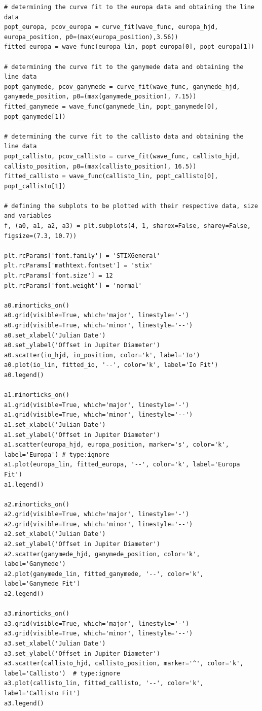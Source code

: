 \documentclass[12pt, a4paper]{article}
\begin{document}
\begin{verbatim}
# determining the curve fit to the europa data and obtaining the line data
popt_europa, pcov_europa = curve_fit(wave_func, europa_hjd, europa_position, p0=(max(europa_position),3.56))
fitted_europa = wave_func(europa_lin, popt_europa[0], popt_europa[1])

# determining the curve fit to the ganymede data and obtaining the line data
popt_ganymede, pcov_ganymede = curve_fit(wave_func, ganymede_hjd, ganymede_position, p0=(max(ganymede_position), 7.15))
fitted_ganymede = wave_func(ganymede_lin, popt_ganymede[0], popt_ganymede[1])

# determining the curve fit to the callisto data and obtaining the line data
popt_callisto, pcov_callisto = curve_fit(wave_func, callisto_hjd, callisto_position, p0=(max(callisto_position), 16.5))
fitted_callisto = wave_func(callisto_lin, popt_callisto[0], popt_callisto[1])

# defining the subplots to be plotted with their respective data, size and variables
f, (a0, a1, a2, a3) = plt.subplots(4, 1, sharex=False, sharey=False, figsize=(7.3, 10.7))

plt.rcParams['font.family'] = 'STIXGeneral'
plt.rcParams['mathtext.fontset'] = 'stix'
plt.rcParams['font.size'] = 12
plt.rcParams['font.weight'] = 'normal'

a0.minorticks_on()
a0.grid(visible=True, which='major', linestyle='-')
a0.grid(visible=True, which='minor', linestyle='--')
a0.set_xlabel('Julian Date')
a0.set_ylabel('Offset in Jupiter Diameter')
a0.scatter(io_hjd, io_position, color='k', label='Io')
a0.plot(io_lin, fitted_io, '--', color='k', label='Io Fit')
a0.legend()

a1.minorticks_on()
a1.grid(visible=True, which='major', linestyle='-')
a1.grid(visible=True, which='minor', linestyle='--')
a1.set_xlabel('Julian Date')
a1.set_ylabel('Offset in Jupiter Diameter')
a1.scatter(europa_hjd, europa_position, marker='s', color='k', label='Europa') # type:ignore
a1.plot(europa_lin, fitted_europa, '--', color='k', label='Europa Fit')
a1.legend()

a2.minorticks_on()
a2.grid(visible=True, which='major', linestyle='-')
a2.grid(visible=True, which='minor', linestyle='--')
a2.set_xlabel('Julian Date')
a2.set_ylabel('Offset in Jupiter Diameter')
a2.scatter(ganymede_hjd, ganymede_position, color='k', label='Ganymede')
a2.plot(ganymede_lin, fitted_ganymede, '--', color='k', label='Ganymede Fit')
a2.legend()

a3.minorticks_on()
a3.grid(visible=True, which='major', linestyle='-')
a3.grid(visible=True, which='minor', linestyle='--')
a3.set_xlabel('Julian Date')
a3.set_ylabel('Offset in Jupiter Diameter')
a3.scatter(callisto_hjd, callisto_position, marker='^', color='k', label='Callisto')  # type:ignore
a3.plot(callisto_lin, fitted_callisto, '--', color='k', label='Callisto Fit')
a3.legend()


\end{verbatim}
\end{document}
